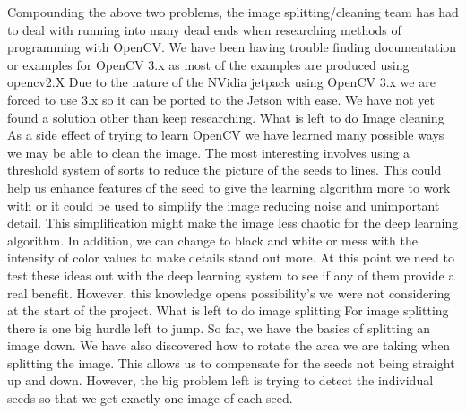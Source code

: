 \documentclass[onecolumn, draftclsnofoot,10pt, compsoc]{IEEEtran}
\begin{document}
Compounding the above two problems, the image splitting/cleaning team has had to deal with running into many dead ends when researching methods of programming with OpenCV. We have been having trouble finding documentation or examples for OpenCV 3.x as most of the examples are produced using opencv2.X Due to the nature of the NVidia jetpack using OpenCV 3.x we are forced to use 3.x so it can be ported to the Jetson with ease. We have not yet found a solution other than keep researching. 
What is left to do Image cleaning 
As a side effect of trying to learn OpenCV we have learned many possible ways we may be able to clean the image. The most interesting involves using a threshold system of sorts to reduce the picture of the seeds to lines. This could help us enhance features of the seed to give the learning algorithm more to work with or it could be used to simplify the image reducing noise and unimportant detail. This simplification might make the image less chaotic for the deep learning algorithm. In addition, we can change to black and white or mess with the intensity of color values to make details stand out more. At this point we need to test these ideas out with the deep learning system to see if any of them provide a real benefit. However, this knowledge opens possibility’s we were not considering at the start of the project. 
What is left to do image splitting 
For image splitting there is one big hurdle left to jump. So far, we have the basics of splitting an image down. We have also discovered how to rotate the area we are taking when splitting the image. This allows us to compensate for the seeds not being straight up and down. However, the big problem left is trying to detect the individual seeds so that we get exactly one image of each seed. 
\end{document}
